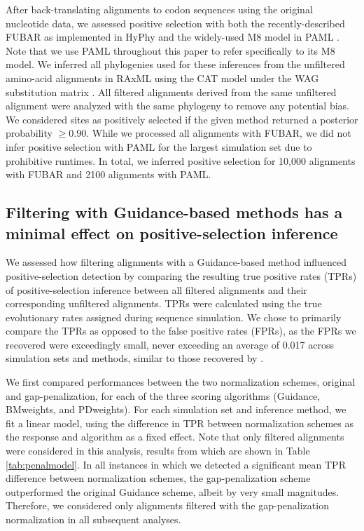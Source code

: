 \documentclass[10pt]{article}
\begin{document}
After back-translating alignments to codon sequences using the original nucleotide data, we assessed positive selection with both the recently-described FUBAR \citep{Murrell2013} as implemented in HyPhy \citep{Pond2005} and the widely-used M8 model in PAML \citep{Yang2007}. Note that we use PAML throughout this paper to refer specifically to its M8 model.  We inferred all phylogenies used for these inferences from the unfiltered amino-acid alignments in RAxML \citep{Stamatakis2006} using the CAT model \citep{Stamatakis2006C} under the WAG substitution matrix \citep{Whelan2001}. All filtered alignments derived from the same unfiltered alignment were analyzed with the same phylogeny to remove any potential bias. We considered sites as positively selected if the given method returned a posterior probability $\geq0.90$. While we processed all alignments with FUBAR, we did not infer positive selection with PAML for the largest simulation set due to prohibitive runtimes. In total, we inferred positive selection for 10,000 alignments with FUBAR and 2100 alignments with PAML.


\subsection*{Filtering with Guidance-based methods has a minimal effect on positive-selection inference}

We assessed how filtering alignments with a Guidance-based method influenced positive-selection detection by comparing the resulting true positive rates (TPRs) of positive-selection inference between all filtered alignments and their corresponding unfiltered alignments. TPRs were calculated using the true evolutionary rates assigned during sequence simulation. We chose to primarily compare the TPRs as opposed to the false positive rates (FPRs), as the FPRs we recovered were exceedingly small, never exceeding an average of 0.017 across simulation sets and methods, similar to those recovered by \citet{Jordan2012}. 

We first compared performances between the two normalization schemes, original and gap-penalization, for each of the three scoring algorithms (Guidance, BMweights, and PDweights). For each simulation set and inference method, we fit a linear model, using the difference in TPR between normalization schemes as the response and algorithm as a fixed effect. Note that only filtered alignments were considered in this analysis, results from which are shown in Table \ref{tab:penalmodel}. In all instances in which we detected a significant mean TPR difference between normalization schemes, the gap-penalization scheme outperformed the original Guidance scheme, albeit by very small magnitudes. Therefore, we considered only alignments filtered with the gap-penalization normalization in all subsequent analyses.
\end{document}
